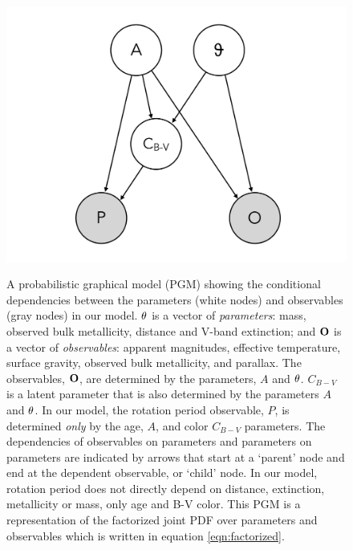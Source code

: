 \begin{figure}
  \caption{
A probabilistic graphical model (PGM) showing the conditional
dependencies between the parameters (white nodes) and
observables (gray nodes) in our model.
${\bf \theta}$ is a vector of {\it parameters}: mass, observed bulk
    metallicity, distance and V-band extinction; and ${\bf O}$ is a vector of
    {\it observables}: apparent magnitudes, effective temperature, surface
    gravity, observed bulk metallicity, and parallax.
    The observables, ${\bf O}$, are determined by the parameters, $A$ and
    ${\bf \theta}$.
    $C_{B-V}$ is a latent parameter that is also determined by the parameters
    $A$ and ${\bf \theta}$.
    In our model, the rotation period observable, $P$, is determined {\it
    only} by the age, $A$, and color ${C_{B-V}}$ parameters.
The dependencies of observables on parameters and parameters on parameters are
    indicated by arrows that start at a `parent' node and end at the dependent
    observable, or `child' node.
In our model, rotation period does not directly depend on distance,
extinction, metallicity or mass, only age and B-V color.
This PGM is a representation of the factorized joint PDF over parameters and
observables which is written in equation \ref{eqn:factorized}.
}
  \centering
    \includegraphics[width=.7\textwidth]{PGM}
\label{fig:PGM}
\end{figure}

